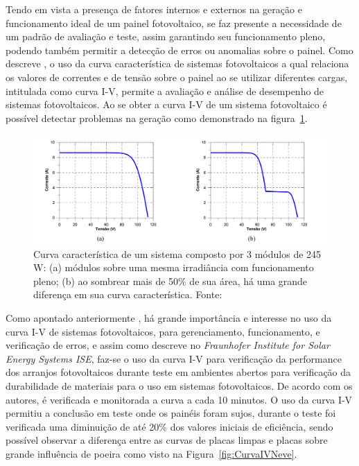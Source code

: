 Tendo em vista a presença de fatores internos e externos na geração e funcionamento ideal de um painel fotovoltaico, se faz presente a necessidade de um padrão de avaliação e teste, assim garantindo seu funcionamento pleno, podendo também permitir a detecção de erros ou anomalias sobre o painel. Como descreve , o uso da curva característica de sistemas fotovoltaicos a qual relaciona os valores de correntes e de tensão sobre o painel ao se utilizar diferentes cargas, intitulada como curva I-V, permite a avaliação e análise de desempenho de sistemas fotovoltaicos. Ao se obter a curva I-V de um sistema fotovoltaico é possível detectar problemas na geração como demonstrado na figura~\ref{fig:CurvaIV}.

\FloatBarrier
\begin{figure}[htbp]
	\centering
	\includegraphics[scale=0.4]{imagens/CurvaIV}
	\caption{Curva característica de um sistema composto por 3 módulos de 245 W: (a) módulos sobre uma mesma irradiância com funcionamento pleno; (b) ao sombrear mais de 50\% de sua área, há uma grande diferença em sua curva característica. Fonte:   }
	
	\label{fig:CurvaIV}
\end{figure}
\FloatBarrier


Como apontado anteriormente , há grande importância e interesse no uso da curva I-V de sistemas fotovoltaicos, para gerenciamento, funcionamento, e verificação de erros, e assim como descreve  no \textit{Fraunhofer Institute for Solar Energy Systems ISE}, faz-se o uso da curva I-V para verificação da performance dos arranjos fotovoltaicos durante teste em ambientes abertos para verificação da durabilidade de materiais para o uso em sistemas fotovoltaicos. De acordo com os autores, é verificada e monitorada a curva a cada 10 minutos. O uso da curva I-V permitiu a conclusão em teste onde os painéis foram sujos, durante o teste foi verificada uma diminuição de até 20\% dos valores iniciais de eficiência, sendo possível observar a diferença entre as curvas de placas limpas e placas sobre grande influência de poeira como visto na Figura~\ref{fig:CurvaIVNeve}.

